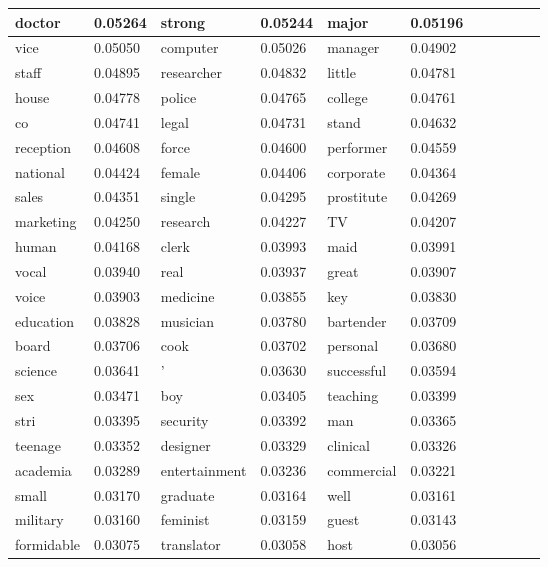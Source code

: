 \begin{table}[h]
\begin{tabular}{|l|l|l|l|l|l|}
 doctor & 0.05264 &  strong & 0.05244 &  major & 0.05196 & & & & & & \\ \hline
 vice & 0.05050 &  computer & 0.05026 &  manager & 0.04902 & & & & & & \\ \hline
 staff & 0.04895 &  researcher & 0.04832 &  little & 0.04781 & & & & & & \\ \hline
 house & 0.04778 &  police & 0.04765 &  college & 0.04761 & & & & & & \\ \hline
 co & 0.04741 &  legal & 0.04731 &  stand & 0.04632 & & & & & & \\ \hline
 reception & 0.04608 &  force & 0.04600 &  performer & 0.04559 & & & & & & \\ \hline
 national & 0.04424 &  female & 0.04406 &  corporate & 0.04364 & & & & & & \\ \hline
 sales & 0.04351 &  single & 0.04295 &  prostitute & 0.04269 & & & & & & \\ \hline
 marketing & 0.04250 &  research & 0.04227 &  TV & 0.04207 & & & & & & \\ \hline
 human & 0.04168 &  clerk & 0.03993 &  maid & 0.03991 & & & & & & \\ \hline
 vocal & 0.03940 &  real & 0.03937 &  great & 0.03907 & & & & & & \\ \hline
 voice & 0.03903 &  medicine & 0.03855 &  key & 0.03830 & & & & & & \\ \hline
 education & 0.03828 &  musician & 0.03780 &  bartender & 0.03709 & & & & & & \\ \hline
 board & 0.03706 &  cook & 0.03702 &  personal & 0.03680 & & & & & & \\ \hline
 science & 0.03641 &  ' & 0.03630 &  successful & 0.03594 & & & & & & \\ \hline
 sex & 0.03471 &  boy & 0.03405 &  teaching & 0.03399 & & & & & & \\ \hline
 stri & 0.03395 &  security & 0.03392 &  man & 0.03365 & & & & & & \\ \hline
 teenage & 0.03352 &  designer & 0.03329 &  clinical & 0.03326 & & & & & & \\ \hline
 academia & 0.03289 &  entertainment & 0.03236 &  commercial & 0.03221 & & & & & & \\ \hline
 small & 0.03170 &  graduate & 0.03164 &  well & 0.03161 & & & & & & \\ \hline
 military & 0.03160 &  feminist & 0.03159 &  guest & 0.03143 & & & & & & \\ \hline
 formidable & 0.03075 &  translator & 0.03058 &  host & 0.03056 & & & & & & \\ \hline

\end{tabular}
\end{table}
